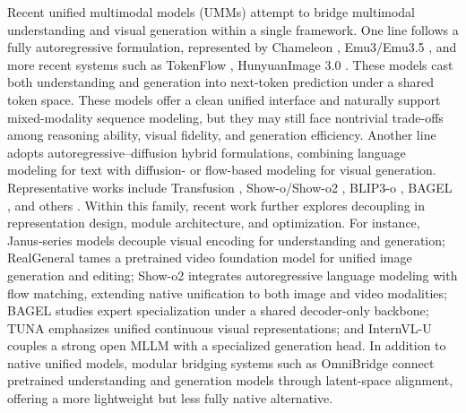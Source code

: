 Recent unified multimodal models (UMMs) attempt to bridge multimodal understanding and visual generation within a single framework. One line follows a fully {autoregressive formulation}, represented by Chameleon \cite{team2024chameleon}, Emu3/Emu3.5 \cite{wang2024emu3,cui2025emu3}, and more recent systems such as TokenFlow \cite{qu2025tokenflow}, HunyuanImage 3.0 \cite{cao2025hunyuanimage}. These models cast both understanding and generation into next-token prediction under a shared token space. These models offer a clean unified interface and naturally support mixed-modality sequence modeling, but they may still face nontrivial trade-offs among reasoning ability, visual fidelity, and generation efficiency.
Another line adopts {autoregressive–diffusion hybrid formulations}, combining language modeling for text with diffusion- or flow-based modeling for visual generation.
Representative works include Transfusion \cite{zhou2024transfusion}, Show-o/Show-o2 \cite{xie2024show,xie2025show}, BLIP3-o \cite{chen2025blip3}, BAGEL \cite{deng2025emerging}, and others \cite{zhao2025unified,liu2025tuna,wang2025ovis,he2025emma,li2025onecat,tian2025unigen,ma2025janusflow,dai2026chatumm,feng2026dreamlite}.
Within this family, recent work further explores decoupling in representation design, module architecture, and optimization. For instance, Janus-series models \cite{zhao2025unified,ma2025janusflow} decouple visual encoding for understanding and generation; RealGeneral \cite{lin2025realgeneral} tames a pretrained video foundation model for unified image generation and editing; Show-o2 \cite{xie2025show} integrates autoregressive language modeling with flow matching, extending native unification to both image and video modalities; BAGEL \cite{deng2025emerging} studies expert specialization under a shared decoder-only backbone; TUNA \cite{liu2025tuna} emphasizes unified continuous visual representations; and InternVL-U \cite{tian2026internvlu} couples a strong open MLLM with a specialized generation head. 
In addition to native unified models, modular bridging systems such as OmniBridge \cite{xiao2025omnibridge} connect pretrained understanding and generation models through latent-space alignment, offering a more lightweight but less fully native alternative.

